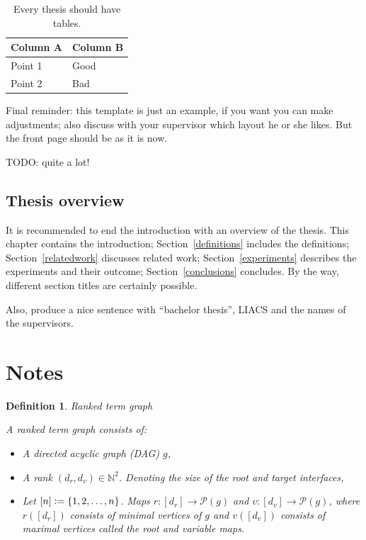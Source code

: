 \documentclass[12pt]{article}
\newtheorem{definition}{Definition}
\newcommand{\defeq}{\vcentcolon=}
\renewcommand{\P}{\mathcal{P}}
\newcommand{\N}{\mathbb{N}}
\newcommand{\1}{\mathbbm{1}}
\begin{document}
\begin{table}[!htbp]
\begin{center}
\begin{tabular}{l|l}
Column A & Column B\\
\hline
Point 1 & Good\\
Point 2 & Bad
\end{tabular}
\end{center}
\caption{Every thesis should have tables.}\label{atable}
\end{table}

Final reminder: this template is just an example, if you want you can make adjustments; also discuss with your supervisor which layout he or she likes. But the front page should be as it is now.

TODO: quite a lot!

\subsection{Thesis overview}
It is recommended to end the introduction with an overview of the thesis. This chapter contains the introduction; Section~\ref{definitions} includes the definitions; Section~\ref{relatedwork} discusses related work; Section~\ref{experiments} describes the experiments and their outcome; Section~\ref{conclusions} concludes. By the way, different section titles are certainly possible.

Also, produce a nice sentence with ``bachelor thesis'', LIACS and the names of the supervisors.
\section{Notes}
\begin{definition}{Ranked term graph}

A \emph{ranked term graph} consists of:
\begin{itemize}
\item A directed acyclic graph (DAG) $g$,
\item A \emph{rank} $(d_r, d_v) \in \N^2$. Denoting the size of the root and target interfaces,
\item Let $[n] \defeq \{1,2,\dots, n\}$. Maps $r: [d_r] \to \P(g)$ and $v: [d_v] \to \P(g)$, where $r([d_r])$ consists of minimal vertices of $g$ and $v([d_v])$ consists of maximal vertices called the \emph{root} and \emph{variable} maps.
\end{itemize}
\end{definition}
\end{document}
